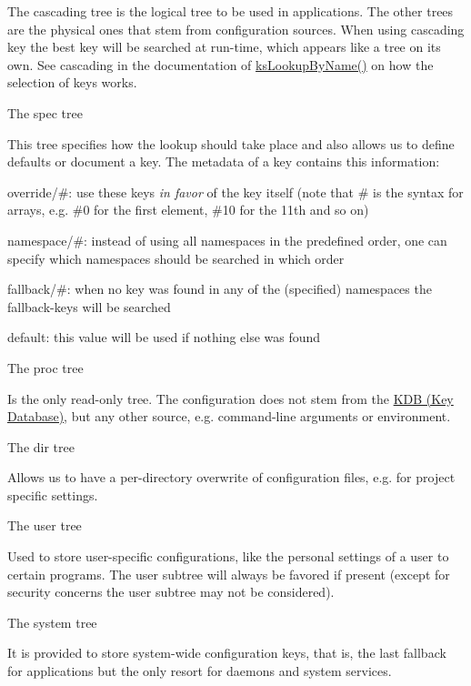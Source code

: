 The cascading tree is the logical tree to be used in applications. The other trees are the physical ones that stem from configuration sources. When using cascading key the best key will be searched at run-\/time, which appears like a tree on its own. See cascading in the documentation of \hyperlink{group__keyset_gad65d2cdcbb5381194a1688e169af8a83}{ks\+Lookup\+By\+Name()} on how the selection of keys works.


\begin{DoxyItemize}
\item The {\ttfamily spec} tree

This tree specifies how the lookup should take place and also allows us to define defaults or document a key. The metadata of a key contains this information\+:
\begin{DoxyItemize}
\item {\ttfamily override/\#}\+: use these keys {\itshape in favor} of the key itself (note that {\ttfamily \#} is the syntax for arrays, e.\+g. {\ttfamily \#0} for the first element, {\ttfamily \#10} for the 11th and so on)
\item {\ttfamily namespace/\#}\+: instead of using all namespaces in the predefined order, one can specify which namespaces should be searched in which order
\item {\ttfamily fallback/\#}\+: when no key was found in any of the (specified) namespaces the {\ttfamily fallback}-\/keys will be searched
\item {\ttfamily default}\+: this value will be used if nothing else was found
\end{DoxyItemize}
\item The {\ttfamily proc} tree

Is the only read-\/only tree. The configuration does not stem from the \hyperlink{group__kdb}{K\+DB (Key Database)}, but any other source, e.\+g. command-\/line arguments or environment.
\item The {\ttfamily dir} tree

Allows us to have a per-\/directory overwrite of configuration files, e.\+g. for project specific settings.
\item The {\ttfamily user} tree

Used to store user-\/specific configurations, like the personal settings of a user to certain programs. The user subtree will always be favored if present (except for security concerns the user subtree may not be considered).
\item The {\ttfamily system} tree

It is provided to store system-\/wide configuration keys, that is, the last fallback for applications but the only resort for daemons and system services.
\end{DoxyItemize}

